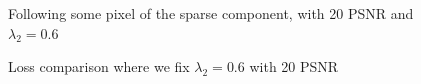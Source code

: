 \documentclass[a4paper,11pt,oneside]{report}
\theoremstyle{named}
\begin{document}
\begin{figure}
    \centering
    \caption{Following some pixel of the sparse component, with 20 PSNR and $\lambda_2 = 0.6$}
    \label{fig:20 sparse}
\end{figure}

\begin{figure}
    \centering
    \caption{Loss comparison where we fix $\lambda_2 = 0.6$ with 20 PSNR}
    \label{fig:20 lossl1}
\end{figure}
\end{document}
